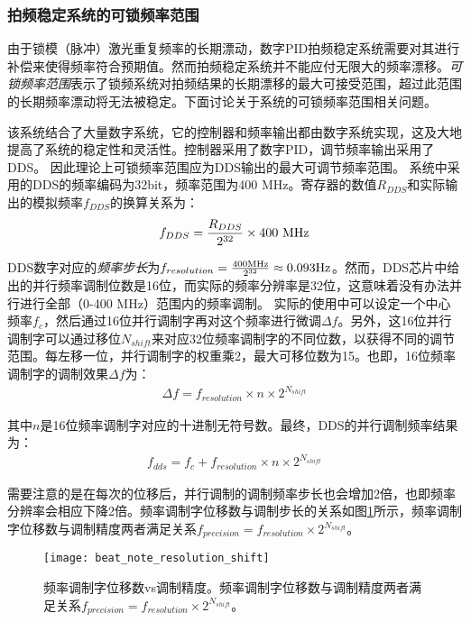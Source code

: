 \subsubsection[拍频稳定系统的可锁频率范围]{拍频稳定系统的可锁频率范围}
由于锁模（脉冲）激光重复频率的长期漂动，数字PID拍频稳定系统需要对其进行补偿来使得频率符合预期值。然而拍频稳定系统并不能应付无限大的频率漂移。\emph{可锁频率范围}表示了锁频系统对拍频结果的长期漂移的最大可接受范围，超过此范围的长期频率漂动将无法被稳定。下面讨论关于系统的可锁频率范围相关问题。

该系统结合了大量数字系统，它的控制器和频率输出都由数字系统实现，这及大地提高了系统的稳定性和灵活性。控制器采用了数字PID，调节频率输出采用了DDS。
因此理论上可锁频率范围应为DDS输出的最大可调节频率范围。
系统中采用的DDS的频率编码为32bit，频率范围为400 MHz。寄存器的数值$R_{DDS}$和实际输出的模拟频率$f_{DDS}$的换算关系为：
\begin{align}
    f_{DDS}=\frac{R_{DDS}}{2^{32}}\times 400\ \textnormal{MHz}
\end{align}

DDS数字对应的\emph{频率步长}为$f_{resolution}=\frac{400\textnormal{MHz}}{2^{32}}\approx0.093\textnormal{Hz}$。然而，DDS芯片中给出的并行频率调制位数是16位，而实际的频率分辨率是32位，这意味着没有办法并行进行全部（0-400 MHz）范围内的频率调制。
实际的使用中可以设定一个中心频率$f_{c}$，然后通过16位并行调制字再对这个频率进行微调$\Delta f$。另外，这16位并行调制字可以通过移位$N_{shift}$来对应32位频率调制字的不同位数，以获得不同的调节范围。每左移一位，并行调制字的权重乘2，最大可移位数为15。也即，16位频率调制字的调制效果$\Delta f$为：
\begin{align}
    \Delta f=f_{resolution}\times n \times 2^{N_{shift}}
\end{align}

其中$n$是16位频率调制字对应的十进制无符号数。最终，DDS的并行调制频率结果为：
\begin{align}
    f_{dds}=f_c+f_{resolution}\times n \times 2^{N_{shift}}
\end{align}



需要注意的是在每次的位移后，并行调制的调制频率步长也会增加2倍，也即频率分辨率会相应下降2倍。频率调制字位移数与调制步长的关系如图\ref{fig:beat_note_resolution_shift}所示，频率调制字位移数与调制精度两者满足关系$f_{precision}=f_{resolution}\times2^{N_{shift}}$。


\begin{figure}
    \centering
    \texttt{[image: beat\_note\_resolution\_shift]}
    \caption[频率调制字位移数vs调制精度
    ]{频率调制字位移数vs调制精度。频率调制字位移数与调制精度两者满足关系$f_{precision}=f_{resolution}\times2^{N_{shift}}$。
    \label{fig:beat_note_resolution_shift}}
\end{figure}


